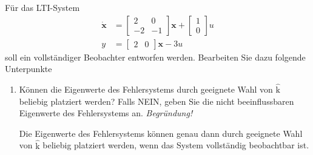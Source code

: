 \documentclass[crop=false]{standalone}
\begin{document}
\begin{task}
Für das LTI-System
\[\begin{aligned} \dot{\mathbf{x}} &=\left[\begin{array}{cc}{2} & {0} \\ {-2} & {-1}\end{array}\right] \mathbf{x}+\left[\begin{array}{c}{1} \\ {0}\end{array}\right] u \\ y &=\left[\begin{array}{cc}{2} & {0}\end{array}\right] \mathbf{x}-3 u \end{aligned}\]
soll ein vollständiger Beobachter entworfen werden. Bearbeiten Sie dazu folgende Unterpunkte
\begin{enumerate}[i]
    \item Können die Eigenwerte des Fehlersystems durch geeignete Wahl von $\hat{\mathrm{k}}$ beliebig
platziert werden? Falls NEIN, geben Sie die nicht beeinflussbaren Eigenwerte des
Fehlersystems an. \emph{Begründung!}
\begin{solution}
Die Eigenwerte des Fehlersystems können genau dann durch geeignete Wahl von $\hat{\mathrm{k}}$ beliebig platziert werden, wenn das System vollständig beobachtbar ist.


\end{solution}
\end{enumerate}
\end{task}
\end{document}
